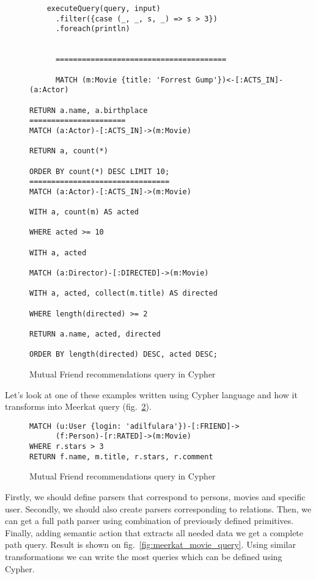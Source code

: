 \begin{figure}[h]
\begin{lstlisting}
    executeQuery(query, input)
      .filter({case (_, _, s, _) => s > 3})
      .foreach(println)


      =======================================

      MATCH (m:Movie {title: 'Forrest Gump'})<-[:ACTS_IN]-(a:Actor)

RETURN a.name, a.birthplace
======================
MATCH (a:Actor)-[:ACTS_IN]->(m:Movie)

RETURN a, count(*)

ORDER BY count(*) DESC LIMIT 10;
================================
MATCH (a:Actor)-[:ACTS_IN]->(m:Movie)

WITH a, count(m) AS acted

WHERE acted >= 10

WITH a, acted

MATCH (a:Director)-[:DIRECTED]->(m:Movie)

WITH a, acted, collect(m.title) AS directed

WHERE length(directed) >= 2

RETURN a.name, acted, directed

ORDER BY length(directed) DESC, acted DESC;
\end{lstlisting}
\caption{Mutual Friend recommendations query in Cypher}
\label{fig:cypher_movie_query}
\end{figure}


Let's look at one of these examples written using Cypher language and how it transforms into Meerkat query
(fig.~\ref{fig:cypher_movie_query}).

\begin{figure}[h]
\begin{lstlisting}
MATCH (u:User {login: 'adilfulara'})-[:FRIEND]->
      (f:Person)-[r:RATED]->(m:Movie)
WHERE r.stars > 3
RETURN f.name, m.title, r.stars, r.comment
\end{lstlisting}
\caption{Mutual Friend recommendations query in Cypher}
\label{fig:cypher_movie_query}
\end{figure}

Firstly, we should define parsers that correspond to persons, movies and specific user.
Secondly, we should also create parsers corresponding to relations.
Then, we can get a full path parser using combination of previously defined primitives.
Finally, adding semantic action that extracts all needed data we get a complete path query.
Result is shown on fig.~\ref{fig:meerkat_movie_query}.
Using similar transformations we can write the most queries which can be defined using Cypher.


